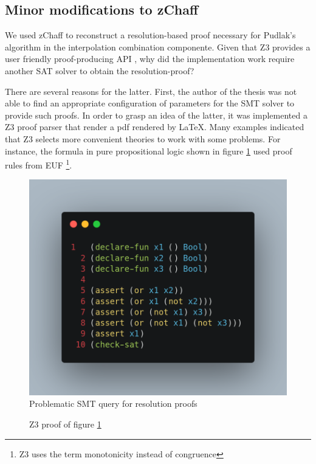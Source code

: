 \subsection{Minor modifications to zChaff}

We used zChaff to reconstruct a resolution-based proof necessary 
for Pudlak's algorithm in the interpolation combination componente. 
Given that Z3 provides a user friendly proof-producing API
\cite{Moura_proofsand}, why did the implementation
work require another SAT solver to obtain the resolution-proof?

There are several reasons for the latter. First, the author of the
thesis was not able to find an appropriate configuration of parameters
for the SMT solver to provide such proofs. In order to grasp an idea
of the latter, it was implemented a Z3 proof parser that render
a pdf rendered by \LaTeX. Many examples indicated that
Z3 selects more convenient theories to work with some problems. For
instance, the formula in pure propositional logic shown in figure 
\ref{query_proof_problem} used proof rules from EUF \footnote{Z3 uses
the term monotonicity instead of congruence}.

\begin{figure}
  \centering
  \includegraphics[scale=0.2]{query_screenshot}
  \caption{Problematic SMT query for resolution proofs} \label{query_proof_problem}
\end{figure}


%
\begin{figure}
  
  \caption{Z3 proof of figure \ref{query_proof_problem}} \label{smt_proof_problem}
\end{figure}


